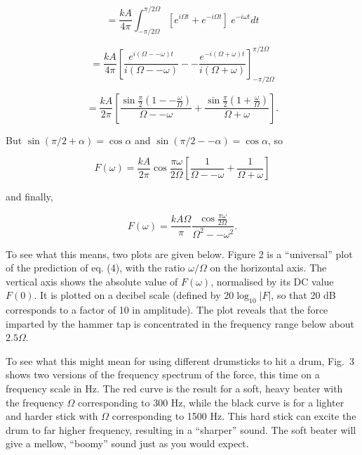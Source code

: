   $$ = \dfrac{kA}{4 \pi} \int_{-\pi/2 \Omega}^{\pi/2 \Omega} \left[ e^{i \Omega 
  t} + e^{-i \Omega t} \right]~e^{-i \omega t} dt $$ 

  $$= \dfrac{kA}{4 \pi} \left[ \dfrac{e^{i (\Omega -- \omega) t}}{i (\Omega -- 
  \omega)} -- \dfrac{e^{-i (\Omega + \omega) t}}{i (\Omega + \omega)} 
  \right]_{-\pi/2 \Omega}^{\pi/2 \Omega} $$ 

  $$= \dfrac{kA}{2 \pi} \left[ \dfrac{\sin \frac{\pi}{2} \left(1 -- 
  \frac{\omega}{\Omega} \right)}{\Omega -- \omega} + \dfrac{\sin \frac{\pi}{2} 
  \left(1 + \frac{\omega}{\Omega} \right)}{\Omega + \omega} \right].$$ 

  But $\sin (\pi/2 + \alpha) = \cos \alpha$ and $\sin(\pi/2 -- \alpha)= \cos 
  \alpha$, so 

  $$F(\omega) = \dfrac{kA}{2 \pi} \cos \dfrac{\pi \omega}{2 \Omega} \left[ 
  \dfrac{1}{\Omega -- \omega} + \dfrac{1}{\Omega + \omega} \right] $$ 

  and finally, 

  $$F(\omega) = \dfrac{kA \Omega}{\pi} \dfrac{\cos \frac{\pi \omega}{2 
  \Omega}}{\Omega^2 -- \omega^2}. \tag{4}$$ 

  To see what this means, two plots are given below. Figure 2 is a 
  ``universal'' plot of the prediction of eq. (4), with the ratio $\omega / 
  \Omega$ on the horizontal axis. The vertical axis shows the absolute value of 
  $F(\omega)$, normalised by its DC value $F(0)$. It is plotted on a decibel 
  scale (defined by $20\log_{10}|F|$, so that 20 dB corresponds to a factor of 
  10 in amplitude). The plot reveals that the force imparted by the hammer tap 
  is concentrated in the frequency range below about $2.5 \Omega$. 

  To see what this might mean for using different drumsticks to hit a drum, 
  Fig.\ 3 shows two versions of the frequency spectrum of the force, this time 
  on a frequency scale in Hz. The red curve is the result for a soft, heavy 
  beater with the frequency $\Omega$ corresponding to 300 Hz, while the black 
  curve is for a lighter and harder stick with $\Omega$ corresponding to 1500 
  Hz. This hard stick can excite the drum to far higher frequency, resulting in 
  a ``sharper'' sound. The soft beater will give a mellow, ``boomy'' sound just 
  as you would expect. 